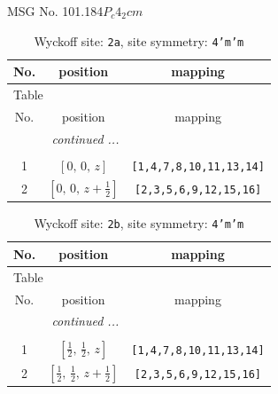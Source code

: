 \documentclass[fleqn,8pt]{jsarticle}
\begin{document}
\setcounter{MaxMatrixCols}{32}

\renewcommand{\tablename}{Table~}
\renewcommand{\figurename}{Figure~}
\begin{center}
\LARGE
MSG No. 101.184\quad$P_{c}4_{2}cm$
\end{center}
\renewcommand{\arraystretch}{1.2}
\begin{longtable}{ccc}
\caption{Wyckoff site: {\tt 2a}, site symmetry: {\tt 4'm'm}}
 \\
 \hline \hline
No. & position & mapping \\ \hline \endfirsthead

\multicolumn{2}{l}{\tablename\ \thetable{}} \\
 \hline \hline
No. & position & mapping \\ \hline \endhead

 \hline \hline
\multicolumn{2}{r}{\footnotesize\it continued ...} \\ \endfoot

 \hline \hline
\multicolumn{2}{r}{} \\ \endlastfoot

1 & $\left[ 0,\, 0,\, z \right]$ & {\tt [1,4,7,8,10,11,13,14]} \\ \hline
2 & $\left[ 0,\, 0,\, z + \frac{1}{2} \right]$ & {\tt [2,3,5,6,9,12,15,16]} \\
\end{longtable}
\renewcommand{\arraystretch}{1.2}
\begin{longtable}{ccc}
\caption{Wyckoff site: {\tt 2b}, site symmetry: {\tt 4'm'm}}
 \\
 \hline \hline
No. & position & mapping \\ \hline \endfirsthead

\multicolumn{2}{l}{\tablename\ \thetable{}} \\
 \hline \hline
No. & position & mapping \\ \hline \endhead

 \hline \hline
\multicolumn{2}{r}{\footnotesize\it continued ...} \\ \endfoot

 \hline \hline
\multicolumn{2}{r}{} \\ \endlastfoot

1 & $\left[ \frac{1}{2},\, \frac{1}{2},\, z \right]$ & {\tt [1,4,7,8,10,11,13,14]} \\ \hline
2 & $\left[ \frac{1}{2},\, \frac{1}{2},\, z + \frac{1}{2} \right]$ & {\tt [2,3,5,6,9,12,15,16]} \\
\end{longtable}
\end{document}
